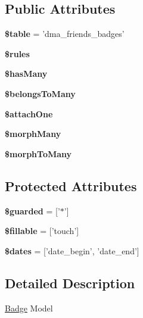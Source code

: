 \subsection*{Public Attributes}
\begin{DoxyCompactItemize}
\item 
\hypertarget{classDMA_1_1Friends_1_1Models_1_1Badge_aa58560300753d15561b1a979aa21b8fd}{{\bfseries \$table} = 'dma\-\_\-friends\-\_\-badges'}\label{classDMA_1_1Friends_1_1Models_1_1Badge_aa58560300753d15561b1a979aa21b8fd}

\item 
{\bfseries \$rules}
\item 
{\bfseries \$has\-Many}
\item 
{\bfseries \$belongs\-To\-Many}
\item 
{\bfseries \$attach\-One}
\item 
{\bfseries \$morph\-Many}
\item 
{\bfseries \$morph\-To\-Many}
\end{DoxyCompactItemize}
\subsection*{Protected Attributes}
\begin{DoxyCompactItemize}
\item 
\hypertarget{classDMA_1_1Friends_1_1Models_1_1Badge_ae0b360f20ce06a26af28c91de3f63e11}{{\bfseries \$guarded} = \mbox{[}'$\ast$'\mbox{]}}\label{classDMA_1_1Friends_1_1Models_1_1Badge_ae0b360f20ce06a26af28c91de3f63e11}

\item 
\hypertarget{classDMA_1_1Friends_1_1Models_1_1Badge_a4d4f326e6071e6d44fdb54d93d579c44}{{\bfseries \$fillable} = \mbox{[}'touch'\mbox{]}}\label{classDMA_1_1Friends_1_1Models_1_1Badge_a4d4f326e6071e6d44fdb54d93d579c44}

\item 
\hypertarget{classDMA_1_1Friends_1_1Models_1_1Badge_ae8aa2206bbd9a6e152db7691a0dfd0b5}{{\bfseries \$dates} = \mbox{[}'date\-\_\-begin', 'date\-\_\-end'\mbox{]}}\label{classDMA_1_1Friends_1_1Models_1_1Badge_ae8aa2206bbd9a6e152db7691a0dfd0b5}

\end{DoxyCompactItemize}


\subsection{Detailed Description}
\hyperlink{classDMA_1_1Friends_1_1Models_1_1Badge}{Badge} Model 

